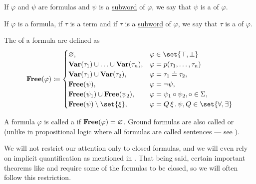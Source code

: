 \begin{definition}
\begin{thmenum}
     If \( \varphi \) and \( \psi \) are formulas and \( \psi \) is a \hyperref[def:formal_language/subword]{subword} of \( \varphi \), we say that \( \psi \) is a  of \( \varphi \).

     If \( \varphi \) is a formula, if \( \tau \) is a term and if \( \tau \) is a \hyperref[def:formal_language/subword]{subword} of \( \varphi \), we say that \( \tau \) is a  of \( \varphi \).

     The  of a formula are defined as
    \begin{equation}\label{eq:def:first_order_syntax/formula_free_variables}
      \boldop{Free}(\varphi) \coloneqq \begin{cases}
        \varnothing,                                                &\varphi \in \set{ \top, \bot } \\
        \boldop{Var}(\tau_1) \cup \ldots \cup \boldop{Var}(\tau_n), &\varphi = p(\tau_1, \ldots, \tau_n) \\
        \boldop{Var}(\tau_1) \cup \boldop{Var}(\tau_2),             &\varphi = \tau_1 \doteq \tau_2, \\
        \boldop{Free}(\psi),                                        &\varphi = \neg \psi, \\
        \boldop{Free}(\psi_1) \cup \boldop{Free}(\psi_2),           &\varphi = \psi_1 \bincirc \psi_2, \bincirc \in \Sigma, \\
        \boldop{Free}(\psi) \setminus \set{ \xi },                  &\varphi = \quantifier{Q}{\xi} \psi, Q \in \set{ \forall, \exists }
      \end{cases}
    \end{equation}

     A formula \( \varphi \) is called a  if \( \operatorname{\mathbf{Free}}(\varphi) = \varnothing \). Ground formulas are also called  or  (unlike in propositional logic where all formulas are called sentences --- see ).

    We will not restrict our attention only to closed formulas, and we will even rely on implicit quantification as mentioned in . That being said, certain important theorems like  and  require some of the formulas to be closed, so we will often follow this restriction.


\end{thmenum}
\end{definition}
